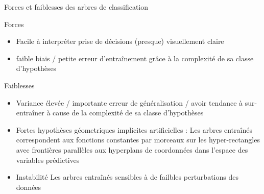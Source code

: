 

\begin{frame}{\vskip -0.2cm \Large Forces et faiblesses des arbres de classification}

\vskip 0.3cm

\scriptsize
\pause
{\large Forces}
\vskip 0.05cm
\begin{itemize}
\pause
\item
	{\normalsize Facile \`a interpr\'eter}
	\vskip 0.1cm
	prise de d\'ecisions (presque) visuellement claire 

\vskip 0.25cm
\pause
\item
	{\normalsize faible biais / petite erreur d'entra\^{i}nement}
	\vskip 0.1cm
	gr\^{a}ce \`{a} la complexit\'{e} de sa classe d'hypoth\`eses
\end{itemize}

\vskip 0.3cm
\pause
{\large Faiblesses}
\vskip 0.05cm
\begin{itemize}
\pause
\item
	{\normalsize Variance \'elev\'ee / importante erreur de g\'en\'eralisation / avoir tendance \`a sur-entra\^iner}
	\vskip 0.1cm
	\`{a} cause de la complexit\'{e} de sa classe d'hypoth\`eses

\vskip 0.3cm
\pause
\item
	{\normalsize Fortes hypoth\`{e}ses g\'eometriques implicites artificielles :}
	\vskip 0.1cm
	Les arbres entra\^{i}n\'es correspondent aux fonctions constantes par morceaux
	sur les hyper-rectangles avec fronti\`eres
	parall\`{e}les aux hyperplans de coordonn\'ees dans l'espace des variables pr\'edictives
	
\vskip 0.3cm
\pause
\item
	{\normalsize Instabilit\'{e}}
	\vskip 0.1cm
	Les arbres entra\^{i}n\'es sensibles \`a de failbles perturbations des donn\'{e}es
\end{itemize}

\end{frame}
\normalsize

